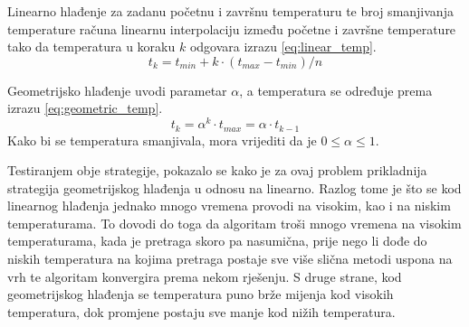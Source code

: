 Linearno hlađenje za zadanu početnu i završnu temperaturu te broj smanjivanja temperature računa linearnu interpolaciju između početne i završne temperature tako da temperatura u koraku $k$ odgovara izrazu \eqref{eq:linear_temp}.
\begin{equation}
\label{eq:linear_temp}
    t_k = t_{min} + k \cdot \left( t_{max} - t_{min} \right) / n
\end{equation}

Geometrijsko hlađenje uvodi parametar $\alpha$, a temperatura se određuje prema izrazu \eqref{eq:geometric_temp}.
\begin{equation}
\label{eq:geometric_temp}
    t_k = \alpha^k \cdot t_{max} = \alpha \cdot t_{k-1}
\end{equation}
Kako bi se temperatura smanjivala, mora vrijediti da je $0 \le \alpha \le 1$.

Testiranjem obje strategije, pokazalo se kako je za ovaj problem prikladnija strategija geometrijskog hlađenja u odnosu na linearno.
Razlog tome je što se kod linearnog hlađenja jednako mnogo vremena provodi na visokim, kao i na niskim temperaturama.
To dovodi do toga da algoritam troši mnogo vremena na visokim temperaturama, kada je pretraga skoro pa nasumična, prije nego li dođe do niskih temperatura na kojima pretraga postaje sve više slična metodi uspona na vrh te algoritam konvergira prema nekom rješenju.
S druge strane, kod geometrijskog hlađenja se temperatura puno brže mijenja kod visokih temperatura, dok promjene postaju sve manje kod nižih temperatura.
    
